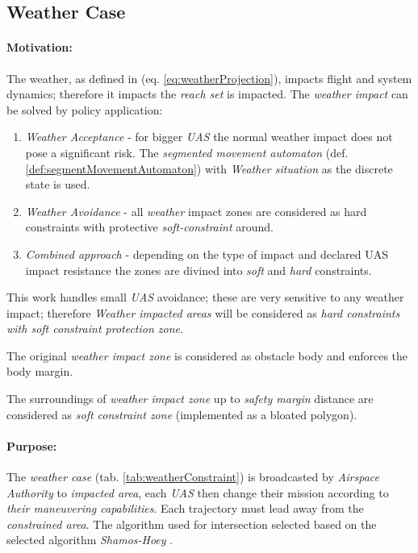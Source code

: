 \newpage
\subsection{Weather Case}\label{sec:weatherCase}
\paragraph{Motivation:}  The weather, as defined in (eq. \ref{eq:weatherProjection}), impacts flight and system dynamics; therefore it impacts the \emph{reach set} is impacted. The \emph{weather impact} can be solved by policy application:

\begin{enumerate}
    \item \emph{Weather Acceptance} - for bigger \emph{UAS} the normal weather impact does not pose a significant risk.  The \emph{segmented movement automaton} (def. \ref{def:segmentMovementAutomaton}) with \emph{Weather situation} as the discrete state is used.
    
    \item \emph{Weather Avoidance} - all \emph{weather} impact zones are considered as hard constraints with protective \emph{soft-constraint} around.
    
    \item \emph{Combined approach} - depending on the type of impact and declared UAS impact resistance the zones are divined into \emph{soft} and \emph{hard} constraints.
\end{enumerate}

\begin{note}
    This work handles small \emph{UAS} avoidance; these are very sensitive to any weather impact; therefore \emph{Weather impacted areas} will be considered as \emph{hard constraints with soft constraint protection zone}. 
    
    The original \emph{weather impact zone} is considered as obstacle body and enforces the body margin.
    
    The surroundings of \emph{weather impact zone} up to \emph{safety margin} distance are considered as \emph{soft constraint zone} (implemented as a bloated polygon).
\end{note}

\paragraph{Purpose:} The \emph{weather case} (tab. \ref{tab:weatherConstraint}) is broadcasted by \emph{Airspace Authority} to \emph{impacted area}, each \emph{UAS} then change their mission according to \emph{their maneuvering capabilities}.  Each trajectory must lead away from the \emph{constrained area}. The algorithm used for intersection selected based on \citep{bentley1979algorithms} the selected algorithm  \emph{Shamos-Hoey} \cite{shamos1976geometric}.

